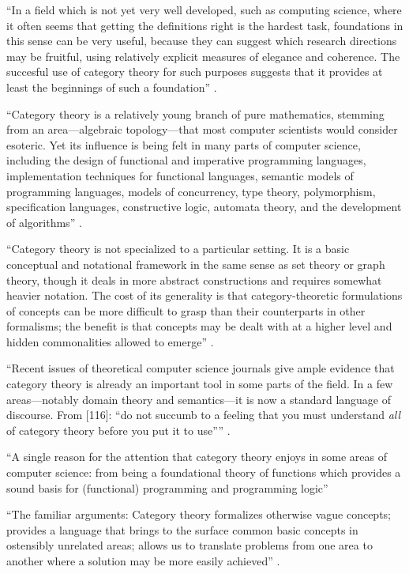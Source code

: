 ``In a field which is not yet very well developed, such as computing
science, where it often seems that getting the definitions right is
the hardest task, foundations in this sense can be very useful,
because they can suggest which research directions may be fruitful,
using relatively explicit measures of elegance and coherence. The
succesful use of category theory for such purposes suggests that it
provides at least the beginnings of such a foundation''
\parencite[64]{goguen-1991}.

``Category theory is a relatively young branch of pure mathematics,
stemming from an area---algebraic topology---that most computer
scientists would consider esoteric. Yet its influence is being felt in
many parts of computer science, including the design of functional and
imperative programming languages, implementation techniques for
functional languages, semantic models of programming languages, models
of concurrency, type theory, polymorphism, specification languages,
constructive logic, automata theory, and the development of
algorithms'' \parencite[xi]{pierce-1991}.

``Category theory is not specialized to a particular setting. It is a
basic conceptual and notational framework in the same sense as set
theory or graph theory, though it deals in more abstract constructions
and requires somewhat heavier notation. The cost of its generality is
that category-theoretic formulations of concepts can be more difficult
to grasp than their counterparts in other formalisms; the benefit is
that concepts may be dealt with at a higher level and hidden
commonalities allowed to emerge'' \parencite[xi]{pierce-1991}.

``Recent issues of theoretical computer science journals give ample
evidence that category theory is already an important tool in some
parts of the field. In a few areas---notably domain theory and
semantics---it is now a standard language of discourse. From [116]:
``do not succumb to a feeling that you must understand \emph{all} of
category theory before you put it to use''''
\parencite[xi]{pierce-1991}.

``A single reason for the attention that category theory enjoys in
some areas of computer science: from being a foundational theory of
functions which provides a sound basis for (functional) programming
and programming logic'' \parencite[414]{poigne-1992}

``The familiar arguments: Category theory formalizes otherwise vague
concepts; provides a language that brings to the surface common basic
concepts in ostensibly unrelated areas; allows us to translate
problems from one area to another where a solution may be more easily
achieved'' \parencite[414]{poigne-1992}.

